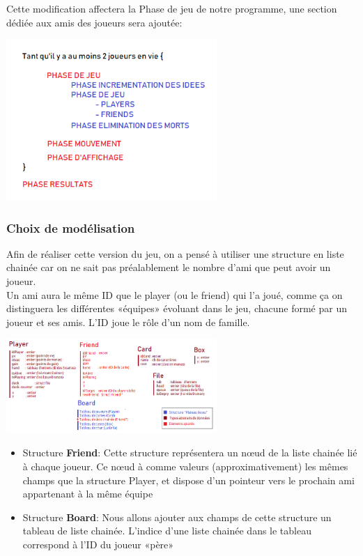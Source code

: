 \documentclass[a4paper]{article}
\begin{document}
Cette modification affectera la Phase de jeu de notre programme, une section dédiée aux amis des joueurs sera ajoutée:

\begin{center}
\includegraphics[width=0.6\textwidth]{Ach3_3}\\[1cm]
\end{center}

\subsubsection{Choix de modélisation}
Afin de réaliser cette version du jeu, on a pensé à utiliser une structure en liste chainée car on ne sait pas préalablement le nombre d’ami que peut avoir un joueur.\\

Un ami aura le même ID que le player (ou le friend) qui l’a joué, comme ça on distinguera les différentes «équipes» évoluant dans le jeu, chacune formé par un joueur et ses amis. L’ID joue le rôle d’un nom de famille.\\

\begin{center}
\includegraphics[width=0.6\textwidth]{Ach3}\\[1cm]
\end{center}

\begin{itemize}
\item Structure \textbf{Friend}:   Cette structure représentera un nœud de la liste chainée lié à chaque joueur. Ce nœud à comme valeurs (approximativement) les mêmes champs que la structure Player, et dispose d’un pointeur vers le prochain ami appartenant à la même équipe\\
\item Structure \textbf{Board}: Nous allons ajouter aux champs de cette structure un tableau de liste chainée. L’indice d’une liste chainée dans le tableau correspond à l’ID du joueur «père»\\
\end{itemize}
\end{document}
